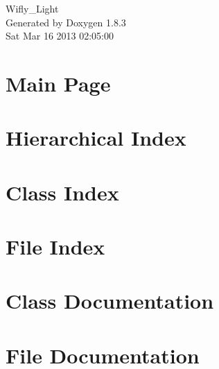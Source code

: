 \documentclass{book}
\begin{document}
\hypersetup{pageanchor=false,citecolor=blue}
\begin{titlepage}
\vspace*{7cm}
\begin{center}
{\Large Wifly\-\_\-\-Light }\\
\vspace*{1cm}
{\large Generated by Doxygen 1.8.3}\\
\vspace*{0.5cm}
{\small Sat Mar 16 2013 02:05:00}\\
\end{center}
\end{titlepage}
\clearemptydoublepage
{}
\tableofcontents
\clearemptydoublepage
{}
\hypersetup{pageanchor=true,citecolor=blue}
\chapter{Main Page}
\label{index}\hypertarget{index}{}
\chapter{Hierarchical Index}

\chapter{Class Index}

\chapter{File Index}

\chapter{Class Documentation}


































\chapter{File Documentation}


\printindex
\end{document}
